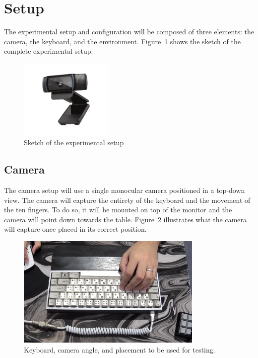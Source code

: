 \documentclass{report}
\begin{document}
\section{Setup}
\label{section:metho-setup}

The experimental setup and configuration will be composed of three elements: the
camera, the keyboard, and the environment. Figure~\ref{fig:metho-setup-cam}
shows the sketch of the complete experimental setup.

\begin{figure}[H]
	\centering
	\includegraphics[width=0.4\textwidth]{webcam.png}
	\caption{Sketch of the experimental setup}
	\label{fig:metho-setup-cam}
	\centering
\end{figure}

\subsection{Camera}
The camera setup will use a single monocular camera positioned in a top-down
view. The camera will capture the entirety of the keyboard and the movement of
the ten fingers. To do so, it will be mounted on top of the monitor and the
camera will point down towards the table. Figure~\ref{fig:metho-setup-keeb}
illustrates what the camera will capture once placed in its correct position.

\begin{figure}[H]
	\centering
	\includegraphics[width=0.8\textwidth]{actual-keeb.png}
	\caption{Keyboard, camera angle, and placement to be used for testing.}
	\label{fig:metho-setup-keeb}
\end{figure}
\end{document}
